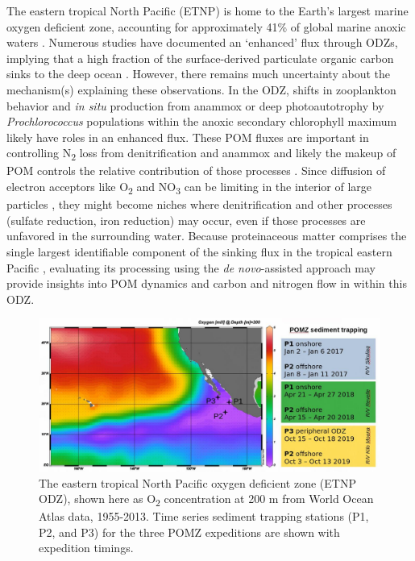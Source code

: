 \documentclass[12pt, letterpaper, twoside]{article}
\begin{document}
The eastern tropical North Pacific (ETNP) is home to the Earth’s largest marine oxygen deficient zone, accounting for approximately 41\% of global marine anoxic waters \cite{paulmier_oxygen_2009}. Numerous studies have documented an ‘enhanced’ flux through ODZs, implying that a high fraction of the surface-derived particulate organic carbon sinks to the deep ocean \cite{devol_role_2001, van_mooy_impact_2002, keil_multiproxy_2016}. However, there remains much uncertainty about the mechanism(s) explaining these observations. In the ODZ, shifts in zooplankton behavior \cite{keil_multiproxy_2016} and \textit{in situ} production from anammox \cite{ganesh_single_2018} or deep photoautotrophy by \textit{Prochlorococcus} populations within the anoxic secondary chlorophyll maximum \cite{fuchsman_cyanobacteria_2019} likely have roles in an enhanced flux. These POM fluxes are important in controlling N\textsubscript{2} loss from denitrification and anammox \cite{fuchsman_cyanobacteria_2019} and likely the makeup of POM controls the relative contribution of those processes \cite{babbin_organic_2014}. Since diffusion of electron acceptors like O\textsubscript{2} and NO\textsubscript{3} can be limiting in the interior of large particles \cite{ploug_ballast_2008, ploug_small-scale_2001, bianchi_global_2018}, they might become niches where denitrification and other processes (sulfate reduction, iron reduction) may occur, even if those processes are unfavored in the surrounding water.  Because proteinaceous matter comprises the single largest identifiable component of the sinking flux in the tropical eastern Pacific \cite{wakeham_molecular_1997}, evaluating its processing using the \textit{de novo}-assisted approach may provide insights into POM dynamics and carbon and nitrogen flow in within this ODZ. 

\bigskip

\begin{figure}
	\includegraphics[width=\linewidth]{pomz-sed-trap-sta.jpg}
	\caption{The eastern tropical North Pacific oxygen deficient zone (ETNP ODZ), shown here as O\textsubscript{2} concentration at 200 m from World Ocean Atlas data, 1955-2013. Time series sediment trapping stations (P1, P2, and P3) for the three POMZ expeditions are shown with expedition timings.}
	\label{fig:etnp map}
\end{figure}
\end{document}
